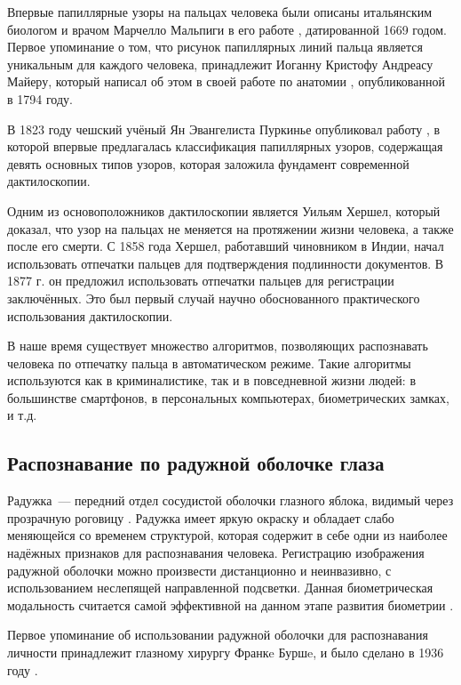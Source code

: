 \documentclass[14pt, a4paper]{extarticle}
\begin{document}
Впервые папиллярные узоры на пальцах человека были описаны итальянским биологом и врачом Марчелло Мальпиги в его работе \cite{malpighi1669opera}, датированной 1669 годом. Первое упоминание о том, что рисунок папиллярных линий пальца является уникальным для каждого человека, принадлежит Иоганну Кристофу Андреасу Майеру, который написал об этом в своей работе по анатомии \cite{mayer1794anatomische}, опубликованной в 1794 году. 

В 1823 году чешский учёный Ян Эвангелиста Пуркинье опубликовал работу \cite{purkynve2013dissertation}, в которой впервые предлагалась классификация папиллярных узоров, содержащая девять основных типов узоров, которая заложила фундамент современной дактилоскопии. 

Одним из основоположников дактилоскопии является Уильям Хершел, который доказал, что узор на пальцах не меняется на протяжении жизни человека, а также после его смерти. С 1858 года Хершел, работавший чиновником в Индии, начал использовать отпечатки пальцев для подтверждения подлинности документов. В 1877 г. он предложил использовать отпечатки пальцев для регистрации заключённых. Это был первый случай научно обоснованного практического использования дактилоскопии.

В наше время существует множество алгоритмов, позволяющих распознавать человека по отпечатку пальца в автоматическом режиме. Такие алгоритмы используются как в криминалистике, так и в повседневной жизни людей: в большинстве смартфонов, в персональных компьютерах, биометрических замках, и т.д.

\subsection{Распознавание по радужной оболочке глаза}
Радужка~--- передний отдел сосудистой оболочки глазного яблока, видимый через прозрачную роговицу \cite{petrovskiy1974bme}. Радужка имеет яркую окраску и обладает слабо меняющейся со временем структурой, которая содержит в себе одни из наиболее надёжных признаков для распознавания человека. Регистрацию изображения радужной оболочки можно произвести дистанционно и неинвазивно, с использованием неслепящей направленной подсветки. Данная биометрическая модальность считается самой эффективной на данном этапе развития биометрии \cite{gupta2011iris}.

Первое упоминание об использовании радужной оболочки для распознавания личности принадлежит глазному хирургу Франкe Буршe, и было сделано в 1936 году \cite{misztal2012iris}.
\end{document}
